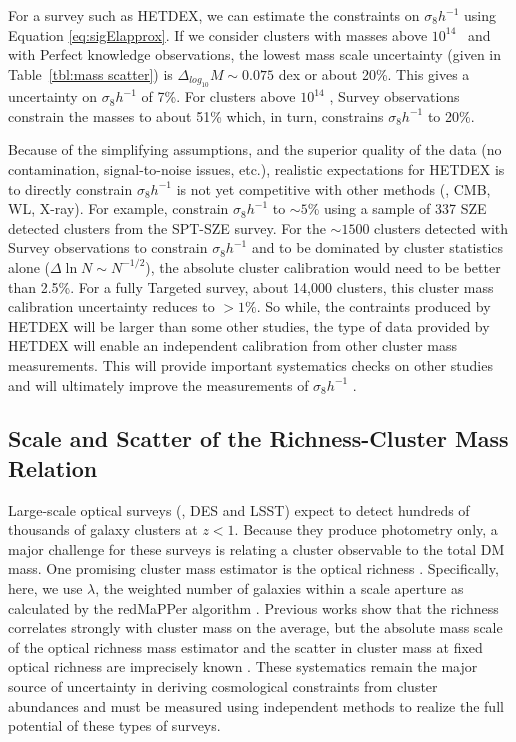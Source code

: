 For a survey such as HETDEX, we can estimate the constraints on $\sigma_8h^{-1}$ using Equation \ref{eq:sigElapprox}. If we consider clusters with masses above $10^{14}$ \Msol\ and with Perfect knowledge observations, the lowest mass scale uncertainty (given in Table~\ref{tbl:mass scatter}) is $\Delta_{log_{10}}M \sim 0.075$ dex or about 20\%. This gives a uncertainty on $\sigma_8h^{-1}$ of 7\%. For clusters above $10^{14}$ \Msol, Survey observations constrain the masses to about 51\% which, in turn, constrains $\sigma_8h^{-1}$ to 20\%.

Because of the simplifying assumptions, and the superior quality of the data (no contamination, signal-to-noise issues, etc.), realistic expectations for HETDEX is to directly constrain $\sigma_8h^{-1}$ is not yet competitive with other methods (\eg, CMB, WL, X-ray). For example, \cite{deHaan2016} constrain $\sigma_8h^{-1}$ to $\sim5$\% using a sample of 337 SZE detected clusters from the SPT-SZE survey. For the $\sim1500$ clusters detected with Survey observations to constrain $\sigma_8h^{-1}$ and to be dominated by cluster statistics alone ($\Delta \ln N \sim N^{-1/2}$), the absolute cluster calibration would need to be better than 2.5\%. For a fully Targeted survey, about 14,000 clusters, this cluster mass calibration uncertainty reduces to $>1\%$. So while, the contraints produced by HETDEX will be larger than some other studies, the type of data provided by HETDEX will enable an independent calibration from other cluster mass measurements. This will provide important systematics checks on other studies and will ultimately improve the measurements of $\sigma_8h^{-1}$ .

\subsection{Scale and Scatter of the Richness-Cluster Mass Relation}
Large-scale optical surveys (\eg, DES and LSST) expect to detect hundreds of thousands of galaxy clusters at $z < 1$. Because they produce photometry only, a major challenge for these surveys is relating a cluster observable to the total DM mass. One promising cluster mass estimator is the optical richness . Specifically, here, we use $\lambda$, the weighted number of galaxies within a scale aperture  as calculated by the redMaPPer algorithm \citep{Rykoff2012}. Previous works  show that the richness correlates strongly with cluster mass on the average, but the absolute mass scale of the optical richness mass estimator and the scatter in cluster mass at fixed optical richness are imprecisely known \citep{Rykoff2012}. These systematics remain the major source of uncertainty in deriving cosmological constraints from cluster abundances and must be measured using independent methods to realize the full potential of these types of surveys.

